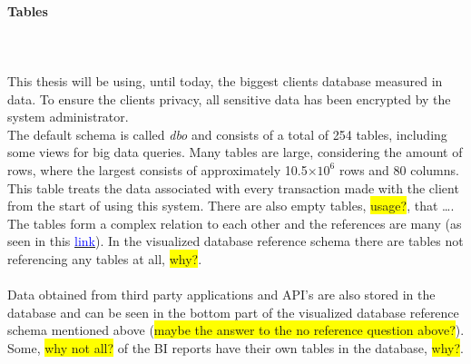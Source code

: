 \documentclass{cslthse-msc}
\newcommand{\hilight}[1]{\colorbox{yellow}{#1}}
\begin{document}
\paragraph*{Tables}\mbox{}\\\\
This thesis will be using, until today, the biggest clients database measured in data. To ensure the clients privacy, all sensitive data has been encrypted by the system administrator. \\The default schema is called \textit{dbo} and consists of a total of 254 tables, including some views for big data queries. Many tables are large, considering the amount of rows, where the largest consists of approximately 10.5$\times 10^6$ rows and 80 columns. This table treats the data associated with every transaction made with the client from the start of using this system. There are also empty tables, \hilight{usage?}, that \ldots. The tables form a complex relation to each other and the references are many (as seen in this \href{https://drive.google.com/file/d/0B1IYTmE2hnD-eGQ0N2tvYXZNNVE/view?usp=sharing}{\textcolor{blue}{link}}). In the visualized database reference schema there are tables not referencing any tables at all, \hilight{why?}.\\\\Data obtained from third party applications and API's are also stored in the database and can be seen in the bottom part of the visualized database reference schema mentioned above (\hilight{maybe the answer to the no reference question above?}). Some, \hilight{why not all?} of the BI reports have their own tables in the database, \hilight{why?}.
\end{document}
